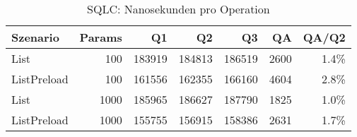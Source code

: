 \begin{table}[ht]
\centering
\caption{SQLC: Nanosekunden pro Operation}
\begin{tabular}{lrrrrrr}
\toprule
Szenario & Params & Q1 & Q2 & Q3 & QA & QA/Q2 \\
\midrule
		List & 100 & 183919 & 184813 & 186519 & 2600 & 1.4\% \\
		ListPreload & 100 & 161556 & 162355 & 166160 & 4604 & 2.8\% \\
		List & 1000 & 185965 & 186627 & 187790 & 1825 & 1.0\% \\
		ListPreload & 1000 & 155755 & 156915 & 158386 & 2631 & 1.7\% \\
\bottomrule
\end{tabular}
\label{tab:benchmark_sqlc_nsperop}
\end{table}
	